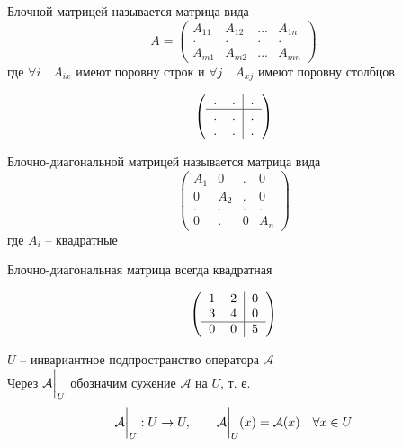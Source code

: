 \begin{definition}
	Блочной матрицей называется матрица вида
	$$ A =
	\begin{pmatrix}
		A_{11} & A_{12} & ... & A_{1n} \\
		. & . & . & . \\
		A_{m1} & A_{m2} & ... & A_{mn}
	\end{pmatrix} $$
	где $ \forall i \quad A_{ix} $ имеют поровну строк и $ \forall j \quad A_{xj} $ имеют поровну столбцов
\end{definition}

\begin{eg}
	$$ \left(
	\begin{tabular}{c c | c}
		. & . & . \\
		\hline
		. & . & . \\
		. & . & .
	\end{tabular} \right) $$
\end{eg}

\begin{definition}
	Блочно-диагональной матрицей называется матрица вида
	$$
	\begin{pmatrix}
		A_1 & 0 & . & 0 \\
		0 & A_2 & . & 0 \\
		. & . & . & . \\
		0 & . & 0 & A_n
	\end{pmatrix} $$
	где $ A_i $ -- квадратные
\end{definition}

\begin{remark}
	Блочно-диагональная матрица всегда квадратная
\end{remark}

\begin{eg}
	$$ \left(
	\begin{tabular}{c c | c}
		1 & 2 & 0 \\
		3 & 4 & 0 \\
		\hline
		0 & 0 & 5
	\end{tabular} \right) $$
\end{eg}

\begin{definition}
	$ U $ -- инвариантное подпространство оператора $ \mathcal{A} $ \\
	Через $ \mathcal{A}\bigg|_{U}^{} $ обозначим сужение $ \mathcal{A} $ на $ U $, т. е.
	$$ \mathcal{A}\bigg|_{U}^{} : U \to U, \qquad \mathcal{A}\bigg|_{U}^{}(x) = \mathcal{A}(x) \quad \forall x \in U $$
\end{definition}

